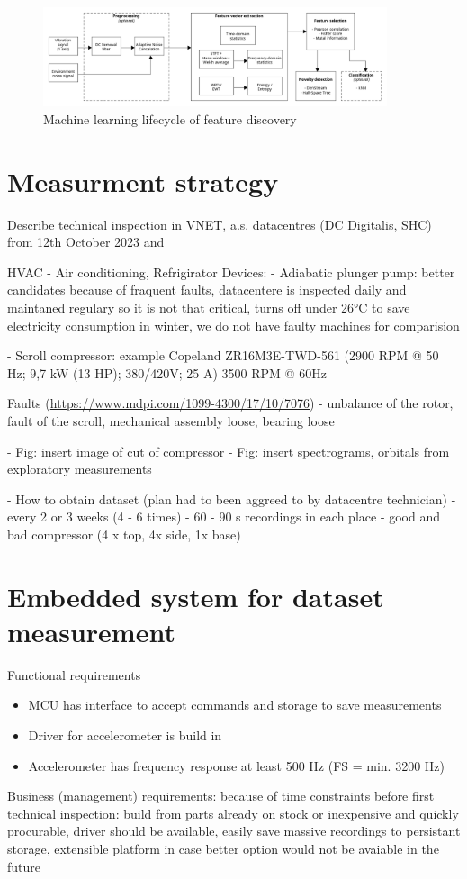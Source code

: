 \begin{figure}[h]
\centering
\includegraphics[width=0.9\textwidth]{assets/ml-lifecycle.png}
\caption{Machine learning lifecycle of feature discovery}
\end{figure}


\section{Measurment strategy}
Describe technical inspection in VNET, a.s. datacentres (DC Digitalis, SHC) from 12th October 2023
and 

HVAC - Air conditioning, Refrigirator
Devices:
	- Adiabatic plunger pump: better candidates because of fraquent faults, datacentere is inspected daily and maintaned regulary so it is not that critical, turns off under 26°C to save electricity consumption in winter, we do not have faulty machines for comparision
	
	- Scroll compressor: example Copeland ZR16M3E-TWD-561 (2900 RPM @ 50 Hz; 9,7 kW (13 HP); 380/420V; 25 A) 3500 RPM @ 60Hz
	
	Faults (\url{https://www.mdpi.com/1099-4300/17/10/7076})
	- unbalance of the rotor, fault of the scroll, mechanical assembly loose, bearing loose
	
	- Fig: insert image of cut of compressor
	- Fig: insert spectrograms, orbitals from exploratory measurements
	
- How to obtain dataset (plan had to been aggreed to by datacentre technician)
 	- every 2 or 3 weeks (4 - 6 times)
 	- 60 - 90 s recordings in each place
  	- good and bad compressor (4 x top, 4x side, 1x base)
	
	
\section{Embedded system for dataset measurement}	
Functional requirements
\begin{itemize}
	\item MCU has interface to accept commands and storage to save measurements
	\item Driver for accelerometer is build in
	\item Accelerometer has frequency response at least 500 Hz (FS = min. 3200 Hz)
\end{itemize}
Business (management) requirements: because of time constraints before first technical inspection: build from parts already on stock or inexpensive and quickly procurable, driver should be available, easily save massive recordings to persistant storage, extensible platform in case better option would not be avaiable in the future

